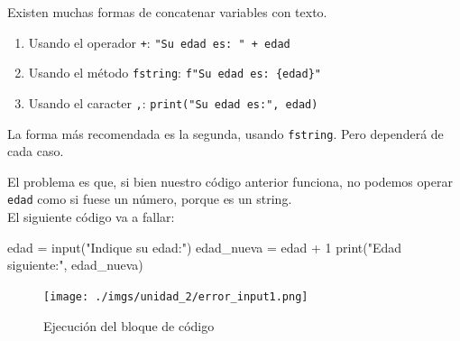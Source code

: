 \documentclass[
  letterpaper,
  DIV=11,
  numbers=noendperiod]{scrreprt}
\newenvironment{Shaded}{\begin{snugshade}}{\end{snugshade}}
\newcommand{\BuiltInTok}[1]{\textcolor[rgb]{0.00,0.23,0.31}{#1}}
\newcommand{\DecValTok}[1]{\textcolor[rgb]{0.68,0.00,0.00}{#1}}
\newcommand{\NormalTok}[1]{\textcolor[rgb]{0.00,0.23,0.31}{#1}}
\newcommand{\OperatorTok}[1]{\textcolor[rgb]{0.37,0.37,0.37}{#1}}
\newcommand{\StringTok}[1]{\textcolor[rgb]{0.13,0.47,0.30}{#1}}
\providecommand{\tightlist}{%
  \setlength{\itemsep}{0pt}\setlength{\parskip}{0pt}}\usepackage{longtable,booktabs,array}
\begin{document}
\begin{tcolorbox}[enhanced jigsaw, bottomrule=.15mm, leftrule=.75mm, opacityback=0, colback=white, toprule=.15mm, bottomtitle=1mm, opacitybacktitle=0.6, rightrule=.15mm, left=2mm, arc=.35mm, coltitle=black, title=\textcolor{quarto-callout-tip-color}{\faLightbulb}\hspace{0.5em}{Imprimiendo Strings y Variables (Iterpolación de Cadenas)}, breakable, toptitle=1mm, colframe=quarto-callout-tip-color-frame, titlerule=0mm, colbacktitle=quarto-callout-tip-color!10!white]

Existen muchas formas de concatenar variables con texto.

\begin{enumerate}
\def\labelenumi{\arabic{enumi}.}
\tightlist
\item
  Usando el operador \texttt{+}: \texttt{"Su\ edad\ es:\ "\ +\ edad}
\item
  Usando el método \texttt{fstring}: \texttt{f"Su\ edad\ es:\ \{edad\}"}
\item
  Usando el caracter \texttt{,}: \texttt{print("Su\ edad\ es:",\ edad)}
\end{enumerate}

La forma más recomendada es la segunda, usando \texttt{fstring}. Pero
dependerá de cada caso.

\end{tcolorbox}

El problema es que, si bien nuestro código anterior funciona, no podemos
operar \texttt{edad} como si fuese un número, porque es un string.\\
El siguiente código va a fallar:

\begin{Shaded}
\begin{Highlighting}[]
\NormalTok{edad }\OperatorTok{=} \BuiltInTok{input}\NormalTok{(}\StringTok{"Indique su edad:"}\NormalTok{)}
\NormalTok{edad\_nueva }\OperatorTok{=}\NormalTok{ edad }\OperatorTok{+} \DecValTok{1}
\BuiltInTok{print}\NormalTok{(}\StringTok{"Edad siguiente:"}\NormalTok{, edad\_nueva)}
\end{Highlighting}
\end{Shaded}

\begin{figure}[H]

{\centering \texttt{[image: ./imgs/unidad\_2/error\_input1.png]}

}

\caption{Ejecución del bloque de código}

\end{figure}%
\end{document}
